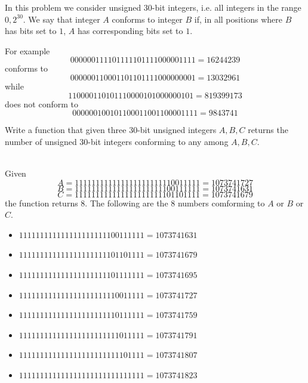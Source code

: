 \begin{exercise}
\label{example:count_numbers_conforming_bitmask:exercice1}
In this problem we consider unsigned 30-bit integers, i.e. all integers in the range $0,2^{30}$.
We say that integer $A$ conforms to integer $B$ if, in all positions where $B$ has bits set to $1$, $A$ has corresponding bits set to $1$.

For example $$00 0000 1111 0111 1101 1110 0000 1111 = 16244239$$ conforms to $$00 0000 1100 0110 1101 1110 0000 0001 = 13032961$$ while $$11 0000 1101 0111 0000 1010 0000 0101 = 819399173$$ does not conform to $$00 0000 1001 0110 0011 0011 0000 1111 =9843741$$

Write a function that given three 30-bit unsigned integers $A,B,C$ returns the number of unsigned 30-bit integers conforming to any among $A,B,C$.

	\begin{example}
		\label{example:count_numbers_conforming_bitmask:example1}
		\hfill \\
		Given $$A = 11 1111 1111 1111 1111 1111 1001 1111 = 1073741727$$
		$$B = 11 1111 1111 1111 1111 1111 0011 1111 = 1073741631$$
		$$C = 11 1111 1111 1111 1111 1111 0110 1111 = 1073741679$$
		the function returns $8$. The following are the $8$ numbers comforming to $A$ or $B$ or $C$.
		\begin{itemize}
			\item  $11 1111 1111 1111 1111 1111 0011 1111 = 1073741631$
			\item  $11 1111 1111 1111 1111 1111 0110 1111 = 1073741679$
			\item  $11 1111 1111 1111 1111 1111 0111 1111 = 1073741695$
			\item  $11 1111 1111 1111 1111 1111 1001 1111 = 1073741727$
			\item  $11 1111 1111 1111 1111 1111 1011 1111 = 1073741759$
			\item  $11 1111 1111 1111 1111 1111 1101 1111 = 1073741791$
			\item  $11 1111 1111 1111 1111 1111 1110 1111 = 1073741807$
			\item  $11 1111 1111 1111 1111 1111 1111 1111 = 1073741823$
		\end{itemize}

	\end{example}

\end{exercise}


